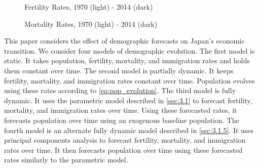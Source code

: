 \documentclass[10pt]{article}
\renewcommand{\thesection}{\arabic{section}}
\renewcommand{\section}[2][]{\oldsection[#1]{#2}\index{#1}\label{sec:\thesection}}
\numberwithin{equation}{subsection}
\newcommand*{\FigureDir}{../../graphs}
\begin{document}
\begin{figure}[!ht]
   \centering
   \caption{\label{fig:fert_data}Fertility Rates, 1970 (light) - 2014 (dark)}
\end{figure}

\begin{figure}[!ht]
   \centering
   \caption{\label{fig:mort_data}Mortality Rates, 1970 (light) - 2014 (dark)}
\end{figure}


\section{Model}

\par This paper considers the effect of demographic forecasts on Japan's economic transition. We consider four models of demographic evolution. The first model is static. It takes population, fertility, mortality, and immigration rates and holds them constant over time. The second model is partially dynamic. It keeps fertility, mortality, and immigration rates constant over time. Population evolves using these rates according to \ref{eq:pop_evolution}. The third model is fully dynamic. It uses the parametric model described in \autoref{sec:3.1} to forecast fertility, mortality, and immigration rates over time. Using these forecasted rates, it forecasts population over time using an exogenous baseline population. The fourth model is an alternate fully dynamic model described in \autoref{sec:3.1.5}. It uses principal components analysis to forecast fertility, mortality, and immigration rates over time. It then forecasts population over time using these forecasted rates similarly to the parametric model.
\end{document}
